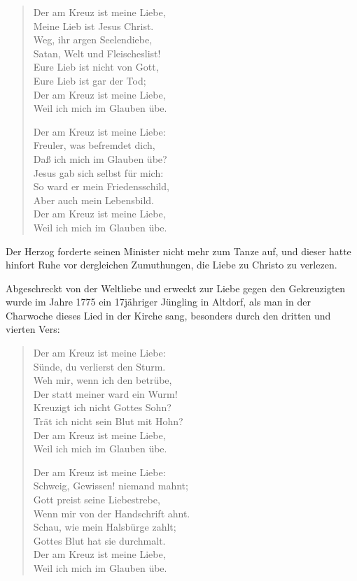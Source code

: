 \begin{verse}
Der am Kreuz ist meine Liebe,\\
Meine Lieb ist Jesus Christ.\\
Weg, ihr argen Seelendiebe,\\
Satan, Welt und Fleischeslist!\\
Eure Lieb ist nicht von Gott,\\
Eure Lieb ist gar der Tod;\\
Der am Kreuz ist meine Liebe,\\
Weil ich mich im Glauben übe.

Der am Kreuz ist meine Liebe:\\
Freuler, was befremdet dich,\\
Daß ich mich im Glauben übe?\\
Jesus gab sich selbst für mich:\\
So ward er mein Friedensschild,\\
Aber auch mein Lebensbild.\\
Der am Kreuz ist meine Liebe,\\
Weil ich mich im Glauben übe.
\end{verse}

Der Herzog forderte seinen Minister nicht mehr zum Tanze auf, und dieser hatte hinfort Ruhe vor dergleichen Zumuthungen, die Liebe zu Christo zu verlezen.

Abgeschreckt von der Weltliebe und erweckt zur Liebe gegen den Gekreuzigten wurde im Jahre 1775 ein 17jähriger Jüngling in Altdorf, als man in der Charwoche dieses Lied in der Kirche sang, besonders durch den dritten und vierten Vers:

\begin{verse}
Der am Kreuz ist meine Liebe:\\
Sünde, du verlierst den Sturm.\\
Weh mir, wenn ich den betrübe,\\
Der statt meiner ward ein Wurm!\\
Kreuzigt ich nicht Gottes Sohn?\\
Trät ich nicht sein Blut mit Hohn?\\
Der am Kreuz ist meine Liebe,\\
Weil ich mich im Glauben übe.

Der am Kreuz ist meine Liebe:\\
Schweig, Gewissen! niemand mahnt;\\
Gott preist seine Liebestrebe,\\
Wenn mir von der Handschrift ahnt.\\
Schau, wie mein Halsbürge zahlt;\\
Gottes Blut hat sie durchmalt.\\
Der am Kreuz ist meine Liebe,\\
Weil ich mich im Glauben übe.
\end{verse}

